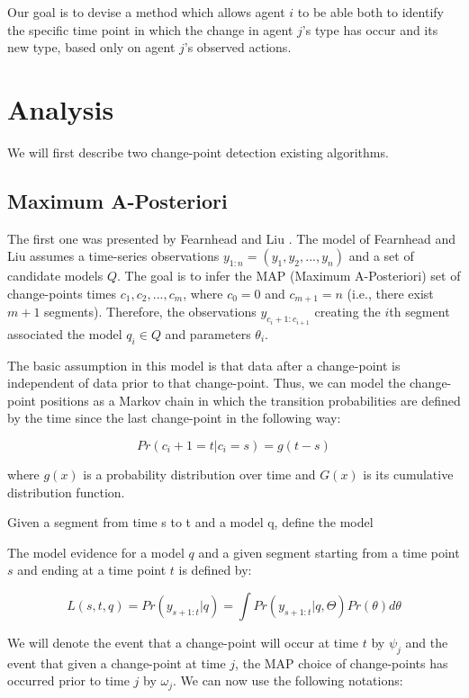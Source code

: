 \documentclass{article}
\begin{document}
Our goal is to devise a method which allows agent $i$ to be able both to identify the specific time point in which the change in agent $j$'s type has occur and its new type, based only on agent $j$'s observed actions.

\section{Analysis}
We will first describe two change-point detection existing algorithms.
\subsection{Maximum A-Posteriori}
The first one was presented by Fearnhead and Liu \cite{fearnhead2007line}. The model of Fearnhead and Liu assumes a time-series observations $y_{1:n} = (y_1, y_2, . . . , y_n)$ and a set of
candidate models $Q$. The goal is to infer the MAP (Maximum A-Posteriori) set of change-points times $c_1, c_2, . . . , c_m$, where $c_0 = 0$ and $c_{m+1} = n$ (i.e., there exist $m + 1$ segments). Therefore, the observations $y_{c_i+1:c_{i+1}}$ creating the $i$th segment associated the model $q_i \in Q$ and parameters $\theta_i$.

The basic assumption in this model is that data after a change-point is independent of data prior to that change-point. Thus, we can model the change-point positions as a Markov chain in which the transition probabilities are defined by the time since the last change-point in the following way:

\begin{equation}
Pr(c_i+1 = t|c_i = s) = g(t - s)
\end{equation}

where $g(x)$ is a probability distribution over time and $G(x)$ is its cumulative distribution function.

Given a segment from time s to t and a model q, define the model 

The model evidence for a model $q$ and a given segment starting from a time point $s$ and ending at a time point $t$ is defined by:

\begin{equation}
L(s,t,q) = Pr(y_{s+1:t}|q) = \int Pr(y_{s+1:t}|q,\Theta)Pr(\theta)d\theta 
\end{equation}

We will denote the event that a change-point will occur at time $t$ by $\psi_j$ and the event that given a change-point at time $j$, the MAP choice of change-points has occurred prior to time $j$ by $\omega_j$. We can now use the following notations:
\end{document}
